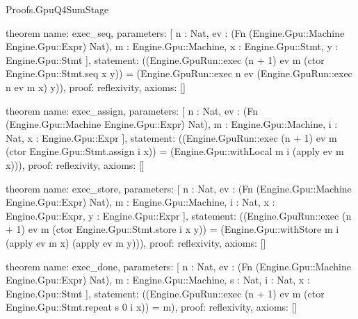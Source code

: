 \begin{lexlean}{Proofs.GpuQ4SumStage}
\begin{semanticmodule}
theorem{
  name: exec_seq,
  parameters: [
    n : Nat,
    ev : (Fn (Engine.Gpu::Machine Engine.Gpu::Expr) Nat),
    m : Engine.Gpu::Machine,
    x : Engine.Gpu::Stmt,
    y : Engine.Gpu::Stmt
  ],
  statement: ((Engine.GpuRun::exec (n + 1) ev m (ctor Engine.Gpu::Stmt.seq x y)) = (Engine.GpuRun::exec n ev (Engine.GpuRun::exec n ev m x) y)),
  proof: reflexivity{},
  axioms: []
}

theorem{
  name: exec_assign,
  parameters: [
    n : Nat,
    ev : (Fn (Engine.Gpu::Machine Engine.Gpu::Expr) Nat),
    m : Engine.Gpu::Machine,
    i : Nat,
    x : Engine.Gpu::Expr
  ],
  statement: ((Engine.GpuRun::exec (n + 1) ev m (ctor Engine.Gpu::Stmt.assign i x)) = (Engine.Gpu::withLocal m i (apply ev m x))),
  proof: reflexivity{},
  axioms: []
}

theorem{
  name: exec_store,
  parameters: [
    n : Nat,
    ev : (Fn (Engine.Gpu::Machine Engine.Gpu::Expr) Nat),
    m : Engine.Gpu::Machine,
    i : Nat,
    x : Engine.Gpu::Expr,
    y : Engine.Gpu::Expr
  ],
  statement: ((Engine.GpuRun::exec (n + 1) ev m (ctor Engine.Gpu::Stmt.store i x y)) = (Engine.Gpu::withStore m i (apply ev m x) (apply ev m y))),
  proof: reflexivity{},
  axioms: []
}

theorem{
  name: exec_done,
  parameters: [
    n : Nat,
    ev : (Fn (Engine.Gpu::Machine Engine.Gpu::Expr) Nat),
    m : Engine.Gpu::Machine,
    s : Nat,
    i : Nat,
    x : Engine.Gpu::Stmt
  ],
  statement: ((Engine.GpuRun::exec (n + 1) ev m (ctor Engine.Gpu::Stmt.repeat s 0 i x)) = m),
  proof: reflexivity{},
  axioms: []
}


\end{semanticmodule}
\end{lexlean}

